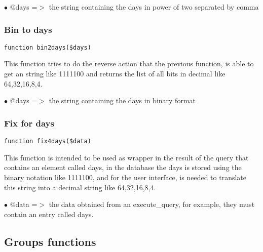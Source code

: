 \documentclass[a4paper]{article}
\begin{document}
\begin{compactitem}
\item[\color{myblue}$\bullet$] @days =$>$ the string containing the days in power of two separated by comma
\end{compactitem}

\hypertarget{toc162}{}
\subsubsection{Bin to days}

\begin{lstlisting}
function bin2days($days)
\end{lstlisting}

This function tries to do the reverse action that the previous function,
is able to get an string like 1111100 and returns the list of all bits in
decimal like 64,32,16,8,4.

\begin{compactitem}
\item[\color{myblue}$\bullet$] @days =$>$ the string containing the days in binary format
\end{compactitem}

\hypertarget{toc163}{}
\subsubsection{Fix for days}

\begin{lstlisting}
function fix4days($data)
\end{lstlisting}

This function is intended to be used as wrapper in the result of the query
that contains an element called days, in the database the days is stored
using the binary notation like 1111100, and for the user interface, is needed
to translate this string into a decimal string like 64,32,16,8,4.

\begin{compactitem}
\item[\color{myblue}$\bullet$] @data =$>$ the data obtained from an execute\_query, for example, they must contain
         an entry called days.
\end{compactitem}

\hypertarget{toc164}{}
\subsection{Groups functions}
\end{document}
